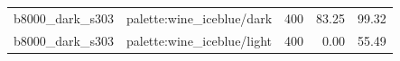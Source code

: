 \begin{longtable}{l>{\raggedright\arraybackslash}p{.42\linewidth}rrr}
b8000\_\allowbreak{}dark\_\allowbreak{}s303 & %
palette:wine\_\allowbreak{}iceblue/dark & %
400 & %
83.25 & %
99.32 \\ %

b8000\_\allowbreak{}dark\_\allowbreak{}s303 & %
palette:wine\_\allowbreak{}iceblue/light & %
400 & %
0.00 & %
55.49 \\ %


\end{longtable}
